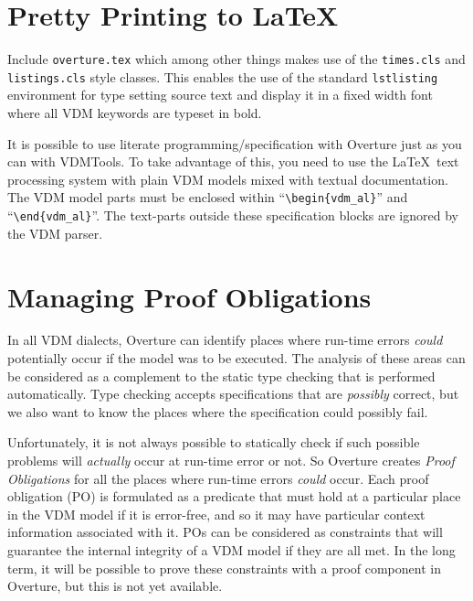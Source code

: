 \documentclass{overturerepchap}
\begin{document}
\chapter{Pretty Printing to \LaTeX}\label{sec:prettyprint}

Include \texttt{overture.tex} which among other things makes use of the
\texttt{times.cls} and \texttt{listings.cls} style classes. This enables
the use of the standard \texttt{lstlisting} environment for type setting
source text and display it in a fixed width font where all VDM keywords
are typeset in bold.

It is possible to use literate programming/specification \cite{Johnson96} with
Overture just as you can with VDMTools. To take advantage of this,
you need to use the \LaTeX\ text processing system with
plain VDM models mixed with textual documentation.  The VDM model parts must be
enclosed within ``\verb+\begin{vdm_al}+'' and ``\verb+\end{vdm_al}+''. The
text-parts outside these specification blocks are ignored by the VDM parser.


\chapter{Managing Proof Obligations}\label{sec:POmanagement}

In all VDM dialects, Overture can identify places where run-time errors
\emph{could} potentially occur if the model was to be executed. The analysis of
these areas can be considered
as a complement to the static type checking that is performed automatically.
Type checking accepts specifications that are \emph{possibly} correct, but
we also want to know the places where the specification could possibly fail.

Unfortunately, it is not always possible to statically check if such
possible problems will \emph{actually} occur at run-time error or not. So Overture
creates \emph{Proof Obligations} for all the places
where run-time errors \emph{could} occur. Each proof obligation (PO)
is formulated as a predicate that must hold at a particular place in the VDM
model if it is error-free, and so it may have particular context information
associated with it. POs can be considered as
constraints that will guarantee the internal integrity of a VDM model if they
are all met. In the long term, it will be possible to prove these constraints
with a proof component in Overture, but this is not yet available.
\end{document}
